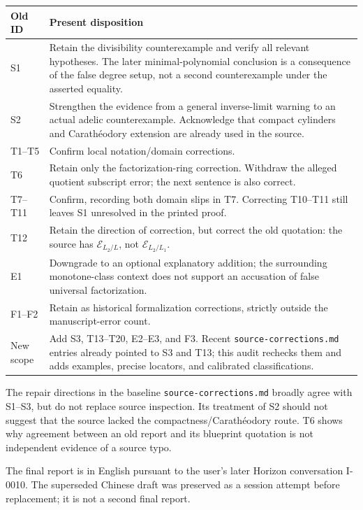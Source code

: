 \documentclass[11pt,a4paper]{article}
\newcommand{\E}{\mathcal E}
\newcommand{\code}[1]{{\small\nolinkurl{#1}}}
\begin{document}
\begin{longtable}{@{}p{19mm}p{\dimexpr\linewidth-19mm-2\tabcolsep\relax}@{}}
\toprule Old ID & Present disposition\\\midrule\endhead
S1 & Retain the divisibility counterexample and verify all relevant hypotheses. The later minimal-polynomial conclusion is a consequence of the false degree setup, not a second counterexample under the asserted equality.\\[4pt]
S2 & Strengthen the evidence from a general inverse-limit warning to an actual adelic counterexample. Acknowledge that compact cylinders and Carathéodory extension are already used in the source.\\[4pt]
T1--T5 & Confirm local notation/domain corrections.\\[4pt]
T6 & Retain only the factorization-ring correction. Withdraw the alleged quotient subscript error; the next sentence is also correct.\\[4pt]
T7--T11 & Confirm, recording both domain slips in T7. Correcting T10--T11 still leaves S1 unresolved in the printed proof.\\[4pt]
T12 & Retain the direction of correction, but correct the old quotation: the source has $\E_{L_2/L}$, not $\E_{L_2/L_1}$.\\[4pt]
E1 & Downgrade to an optional explanatory addition; the surrounding monotone-class context does not support an accusation of false universal factorization.\\[4pt]
F1--F2 & Retain as historical formalization corrections, strictly outside the manuscript-error count.\\[4pt]
New scope & Add S3, T13--T20, E2--E3, and F3. Recent \code{source-corrections.md} entries already pointed to S3 and T13; this audit rechecks them and adds examples, precise locators, and calibrated classifications.\\\bottomrule
\end{longtable}

The repair directions in the baseline \code{source-corrections.md} broadly agree with S1--S3, but do not replace source inspection. Its treatment of S2 should not suggest that the source lacked the compactness/Carathéodory route. T6 shows why agreement between an old report and its blueprint quotation is not independent evidence of a source typo.

The final report is in English pursuant to the user's later Horizon conversation I-0010. The superseded Chinese draft was preserved as a session attempt before replacement; it is not a second final report.
\end{document}
